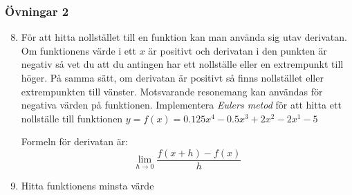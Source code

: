 \documentclass[aspectratio=169]{beamer}
\begin{document}
\begin{frame}
	\frametitle{Övningar 2}
	
	\begin{enumerate}
		\setcounter{enumi}{7}
		\item För att hitta nollstället till en funktion kan man använda sig utav derivatan. Om funktionens värde i ett \(x\) är positivt och derivatan i den punkten är negativ så vet du att du antingen har ett nollställe eller en extrempunkt till höger. På samma sätt, om derivatan är positivt så finns nollstället eller extrempunkten till vänster. Motsvarande resonemang kan användas för negativa värden på funktionen. Implementera \textit{Eulers metod} för att hitta ett nollställe till funktionen \(y=f(x)=0.125 x^4-0.5 x^3+2 x^2-2 x^1-5\)
		
		Formeln för derivatan är: \[\lim_{h\rightarrow0}\dfrac{f(x+h)-f(x)}{h}\]
		
		\item Hitta funktionens minsta värde
	\end{enumerate}
	
\end{frame}
\end{document}
